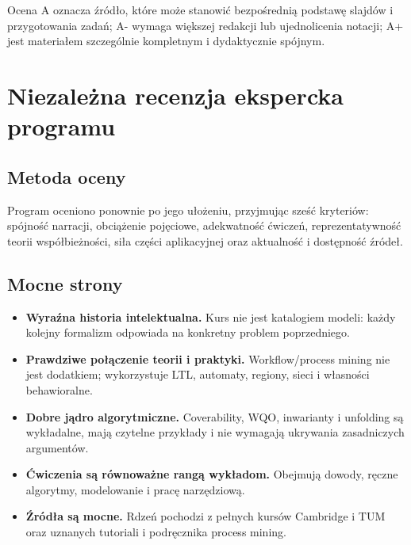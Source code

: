 \documentclass[11pt,a4paper]{article}
\newcommand{\okmark}{\textcolor{greenreview}{\textbf{[OK]}}}
\begin{document}
Ocena A oznacza źródło, które może stanowić bezpośrednią podstawę slajdów i przygotowania zadań; A- wymaga większej redakcji lub ujednolicenia notacji; A+ jest materiałem szczególnie kompletnym i dydaktycznie spójnym.

\section{Niezależna recenzja ekspercka programu}

\subsection{Metoda oceny}
Program oceniono ponownie po jego ułożeniu, przyjmując sześć kryteriów: spójność narracji, obciążenie pojęciowe, adekwatność ćwiczeń, reprezentatywność teorii współbieżności, siła części aplikacyjnej oraz aktualność i dostępność źródeł.

\subsection{Mocne strony}
\begin{itemize}
\item[\okmark] \textbf{Wyraźna historia intelektualna.} Kurs nie jest katalogiem modeli: każdy kolejny formalizm odpowiada na konkretny problem poprzedniego.
\item[\okmark] \textbf{Prawdziwe połączenie teorii i praktyki.} Workflow/process mining nie jest dodatkiem; wykorzystuje LTL, automaty, regiony, sieci i własności behawioralne.
\item[\okmark] \textbf{Dobre jądro algorytmiczne.} Coverability, WQO, inwarianty i unfolding są wykładalne, mają czytelne przykłady i nie wymagają ukrywania zasadniczych argumentów.
\item[\okmark] \textbf{Ćwiczenia są równoważne rangą wykładom.} Obejmują dowody, ręczne algorytmy, modelowanie i pracę narzędziową.
\item[\okmark] \textbf{Źródła są mocne.} Rdzeń pochodzi z pełnych kursów Cambridge i TUM oraz uznanych tutoriali i podręcznika process mining.
\end{itemize}
\end{document}
